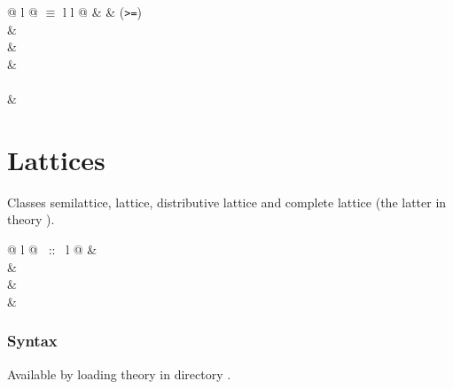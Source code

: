 \begin{isabellebody}
\begin{isamarkuptext}
\begin{supertabular}{@ {} l @ {\quad$\equiv$\quad} l l @ {}}
 &  & (\verb$>=$)\\
 & \\
 & \\
 & \\
\\
 & \\
\end{supertabular}


\section{Lattices}

Classes semilattice, lattice, distributive lattice and complete lattice (the
latter in theory ).

\begin{tabular}{@ {} l @ {~::~} l @ {}}
 & \\
 & \\
 & \\
 & \\
\end{tabular}

\subsubsection*{Syntax}

Available by loading theory  in directory .


\end{isamarkuptext}
\end{isabellebody}
